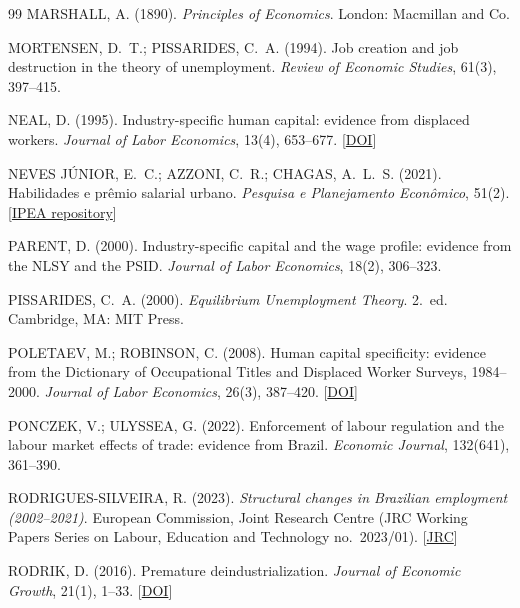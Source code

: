 \documentclass[11pt,a4paper]{article}
\begin{document}
{\begin{thebibliography}{99}
MARSHALL, A. (1890). \textit{Principles of Economics}. London: Macmillan and Co.

MORTENSEN, D.~T.; PISSARIDES, C.~A. (1994). Job creation and job destruction in the theory of unemployment. \textit{Review of Economic Studies}, 61(3), 397--415.

NEAL, D. (1995). Industry-specific human capital: evidence from displaced workers. \textit{Journal of Labor Economics}, 13(4), 653--677. [\href{https://doi.org/10.1086/298388}{DOI}]

NEVES J\'UNIOR, E.~C.; AZZONI, C.~R.; CHAGAS, A.~L.~S. (2021). Habilidades e pr\^emio salarial urbano. \textit{Pesquisa e Planejamento Econ\^omico}, 51(2). [\href{https://repositorio.ipea.gov.br/bitstream/11058/11311/1/ppe_51_n2_2021.pdf}{IPEA repository}]

PARENT, D. (2000). Industry-specific capital and the wage profile: evidence from the NLSY and the PSID. \textit{Journal of Labor Economics}, 18(2), 306--323.

PISSARIDES, C.~A. (2000). \textit{Equilibrium Unemployment Theory}. 2.~ed. Cambridge, MA: MIT Press.

POLETAEV, M.; ROBINSON, C. (2008). Human capital specificity: evidence from the Dictionary of Occupational Titles and Displaced Worker Surveys, 1984--2000. \textit{Journal of Labor Economics}, 26(3), 387--420. [\href{https://www.journals.uchicago.edu/doi/abs/10.1086/588180}{DOI}]

PONCZEK, V.; ULYSSEA, G. (2022). Enforcement of labour regulation and the labour market effects of trade: evidence from Brazil. \textit{Economic Journal}, 132(641), 361--390.

RODRIGUES-SILVEIRA, R. (2023). \textit{Structural changes in Brazilian employment (2002--2021)}. European Commission, Joint Research Centre (JRC Working Papers Series on Labour, Education and Technology no.~2023/01). [\href{https://publications.jrc.ec.europa.eu/repository/handle/JRC132269}{JRC}]

RODRIK, D. (2016). Premature deindustrialization. \textit{Journal of Economic Growth}, 21(1), 1--33. [\href{https://doi.org/10.1007/s10887-015-9122-3}{DOI}]


\end{thebibliography}}
\end{document}
